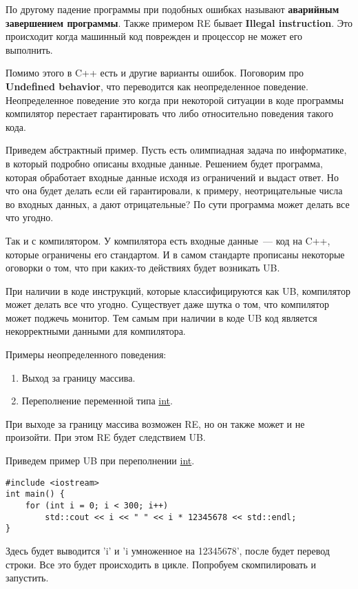 По другому падение программы при подобных ошибках называют \textbf{аварийным завершением программы}.
Также примером RE бывает \textbf{Illegal instruction}. Это происходит когда машинный код поврежден и процессор не может его выполнить.

Помимо этого в C++ есть и другие варианты ошибок. Поговорим про \textbf{Undefined behavior}, что переводится как неопределенное поведение.
Неопределенное поведение это когда при некоторой ситуации в коде программы компилятор перестает гарантировать что либо относительно поведения такого кода.

Приведем абстрактный пример.
Пусть есть олимпиадная задача по информатике, в который подробно описаны входные данные.
Решением будет программа, которая обработает входные данные исходя из ограничений и выдаст ответ.
Но что она будет делать если ей гарантировали, к примеру, неотрицательные числа во входных данных, а дают отрицательные?
По сути программа может делать все что угодно.

Так и с компилятором. У компилятора есть входные данные~--- код на C++, которые ограничены его стандартом. И в самом стандарте прописаны некоторые оговорки о том, что
при каких-то действиях будет возникать UB.

При наличии в коде инструкций, которые классифицируются как UB, компилятор может делать все что угодно. Существует даже шутка о том, что компилятор может поджечь монитор.
Тем самым при наличии в коде UB код является некорректными данными для компилятора.

Примеры неопределенного поведения:

\begin{enumerate}
    \item Выход за границу массива.
    \item Переполнение переменной типа \underline{int}.
\end{enumerate}

При выходе за границу массива возможен RE, но он также может и не произойти.
При этом RE будет следствием UB.

Приведем пример UB при переполнении \underline{int}.

\begin{verbatim}
#include <iostream>
int main() {
    for (int i = 0; i < 300; i++)
        std::cout << i << " " << i * 12345678 << std::endl;
}
\end{verbatim}

Здесь будет выводится 'i' и 'i умноженное на 12345678', после будет перевод строки.
Все это будет происходить в цикле.
Попробуем скомпилировать и запустить.


